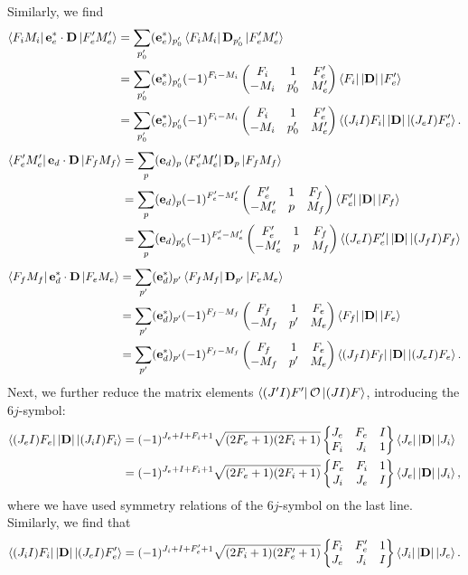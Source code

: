 \documentclass[11pt]{article}
\newcommand{\tj}[6]{ \begin{pmatrix}
		#1 & #2 & #3 \\
		#4 & #5 & #6 
\end{pmatrix}}
\newcommand{\Gj}[6]{ \begin{Bmatrix}
		#1 & #2 & #3 \\
		#4 & #5 & #6 
\end{Bmatrix}}
\begin{document}
Similarly, we find 
\begin{align*}
\bra{F_i M_i} \mathbf{e}^*_e \cdot \mathbf{D} \ket{F'_e M'_e}
&=  \sum_{p'_0} (\mathbf{e}_e^*)_{p'_0} \bra{F_i M_i} \mathbf{D}_{p'_0} \ket{F'_e M'_e}\\
&= \sum_{p'_0} (\mathbf{e}^*_e)_{p'_0} (-1)^{F_i - M_i} \tj{F_i}{1}{F'_e}{-M_i}{p'_0}{M'_e} \bra{F_i} \abs{\mathbf{D}} \ket{F'_e}\\
&= \sum_{p'_0} (\mathbf{e}^*_e)_{p'_0} (-1)^{F_i - M_i} \tj{F_i}{1}{F'_e}{-M_i}{p'_0}{M'_e} \bra{(J_i I)F_i} \abs{\mathbf{D}} \ket{(J_e I)F'_e}.
\end{align*}
\begin{align*}
\bra{F'_e M'_e} \mathbf{e}_d \cdot \mathbf{D} \ket{F_f M_f}
&=  \sum_{p} (\mathbf{e}_d)_{p} \bra{F'_e M'_e} \mathbf{D}_{p} \ket{F_f M_f}\\
&= \sum_{p} (\mathbf{e}_d)_{p} (-1)^{F'_e - M'_e} \tj{F'_e}{1}{F_f}{-M'_e}{p}{M_f} \bra{F_e'} \abs{\mathbf{D}} \ket{F_f}\\
&= \sum_{p} (\mathbf{e}_d)_{p'_0} (-1)^{F'_e - M'_e} \tj{F'_e}{1}{F_f}{-M'_e}{p}{M_f} \bra{(J_e I)F_e'}\abs{\mathbf{D}} \ket{(J_f I)F_f}
\end{align*}
\begin{align*}
\bra{F_f M_f} \mathbf{e}^*_d \cdot \mathbf{D} \ket{F_e M_e}
&=  \sum_{p'} (\mathbf{e}_d^*)_{p'} \bra{F_f M_f} \mathbf{D}_{p'} \ket{F_e M_e}\\
&= \sum_{p'} (\mathbf{e}^*_d)_{p'} (-1)^{F_f - M_f} \tj{F_f}{1}{F_e}{-M_f}{p'}{M_e} \bra{F_f} \abs{\mathbf{D}} \ket{F_e}\\
&= \sum_{p'} (\mathbf{e}^*_d)_{p'} (-1)^{F_f - M_f} \tj{F_f}{1}{F_e}{-M_f}{p'}{M_e} \bra{(J_f I)F_f} \abs{\mathbf{D}} \ket{(J_e I)F_e}.
\end{align*}
Next, we further reduce the matrix elements $\bra{(J'I)F'} \mathcal{O} \ket{(J I) F}$, introducing the $6j$-symbol:
\begin{align*}
\bra{(J_e I) F_e} \abs{\mathbf{D}} \ket{(J_i I)F_i}
&= (-1)^{J_e + I + F_i + 1}\sqrt{(2F_e + 1)(2F_i+1)} 
\Gj{J_e}{F_e}{I}{F_i}{J_i}{1}\bra{J_e}\abs{\mathbf{D}} \ket{J_i} \\
&= (-1)^{J_e + I + F_i + 1}\sqrt{(2F_e + 1)(2F_i+1)} 
\Gj{F_e}{F_i}{1}{J_i}{J_e}{I}\bra{J_e}\abs{\mathbf{D}} \ket{J_i},
\end{align*}
where we have used symmetry relations of the $6j$-symbol on the last line. Similarly, we find that
\begin{align*}
\bra{(J_i I)F_i} \abs{\mathbf{D}} \ket{(J_e I)F'_e}
= (-1)^{J_i + I + F_e' + 1}\sqrt{(2F_i + 1)(2F_e'+1)} 
\Gj{F_i}{F'_e}{1}{J_e}{J_i}{I}\bra{J_i}\abs{\mathbf{D}} \ket{J_e}.
\end{align*}
\end{document}
